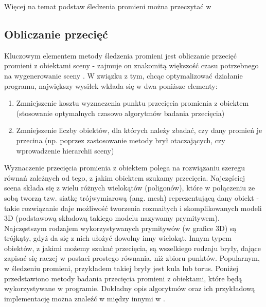 \noindent
Więcej na temat podstaw śledzenia promieni można przeczytać w \cite{foley95, suffern2007, scratch}

\subsection{Obliczanie przecięć}

Kluczowym elementem metody śledzenia promieni jest obliczanie przecięć promieni z obiektami sceny - zajmuje on znakomitą większość czasu potrzebnego na  wygenerowanie sceny \cite{suffern2007}. W związku z tym, chcąc optymalizować działanie programu, największy wysiłek wkłada się w dwa poniższe elementy:

\begin{enumerate}

\item Zmniejszenie kosztu wyznaczenia punktu przecięcia promienia z obiektem (stosowanie optymalnych czasowo algorytmów badania przecięcia)

\item Zmniejszenie liczby obiektów, dla których należy zbadać, czy dany promień je przecina (np. poprzez zastosowanie metody brył otaczających, czy wprowadzenie hierarchii sceny)

\end{enumerate}

Wyznaczenie przecięcia promienia z obiektem polega na rozwiązaniu szeregu równań zależnych od tego, z jakim obiektem szukamy przecięcia. Najczęściej scena składa się z wielu różnych wielokątów (poligonów), które w połączeniu ze sobą tworzą tzw. siatkę trójwymiarową (ang. mesh) reprezentującą dany obiekt - takie rozwiązanie daje możliwość tworzenia rozmaitych i skomplikowanych modeli 3D (podstawową składową takiego modelu nazywamy prymitywem). Najczęstszym rodzajem wykorzystywanych prymitywów (w grafice 3D) są trójkąty, gdyż da się z nich ułożyć dowolny inny wielokąt. Innym typem obiektów, z jakimi możemy szukać przecięcia, są wszelkiego rodzaju bryły, dające zapisać się raczej w postaci prostego równania, niż zbioru punktów. Popularnym, w śledzeniu promieni, przykładem takiej bryły jest kula lub torus. Poniżej przedstawiono metody badania przecięcia promieni z obiektami, które będą wykorzystywane w programie. Dokładny opis algorytmów oraz ich przykładową implementację można znaleźć w między innymi w \cite{dunn02, scratch}.

